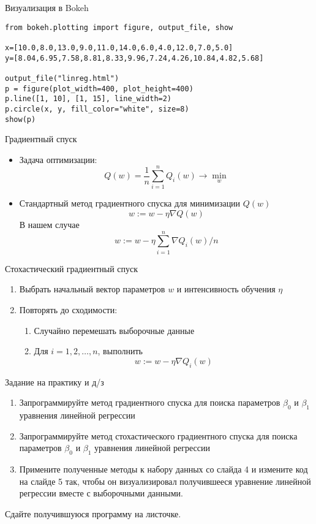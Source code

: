 \documentclass[landscape]{slides}
\begin{document}
\begin{slide}
Визуализация в Bokeh
\begin{verbatim}
from bokeh.plotting import figure, output_file, show

x=[10.0,8.0,13.0,9.0,11.0,14.0,6.0,4.0,12.0,7.0,5.0]
y=[8.04,6.95,7.58,8.81,8.33,9.96,7.24,4.26,10.84,4.82,5.68]

output_file("linreg.html")
p = figure(plot_width=400, plot_height=400)
p.line([1, 10], [1, 15], line_width=2)
p.circle(x, y, fill_color="white", size=8)
show(p)
\end{verbatim}
\end{slide}



\begin{slide}
Градиентный спуск
\begin{itemize}
\item Задача оптимизации:
$$ Q(w) = \frac 1n \sum_{i=1}^n Q_i(w) \to \min_w $$
\item Стандартный метод градиентного спуска для минимизации $Q(w)$
$$ w:=w - \eta \nabla Q(w) $$
В нашем случае
$$ w:=w - \eta \sum_{i=1}^n \nabla Q_i(w)/n $$
\end{itemize}
\end{slide}

\begin{slide}
Стохастический градиентный спуск
\begin{enumerate}
\item Выбрать начальный вектор параметров $w$ и интенсивность обучения $\eta$
\item Повторять до сходимости:
\begin{enumerate}
\item Случайно перемешать выборочные данные
\item Для $i=1,2,\ldots,n$, выполнить
$$ w:=w - \eta \nabla Q_i(w) $$
\end{enumerate}
\end{enumerate}
\end{slide}


\begin{slide}
Задание на практику и д/з
\begin{enumerate}
\item Запрограммируйте метод градиентного спуска для поиска параметров
$\beta_0$ и $\beta_1$ уравнения линейной регрессии
\item Запрограммируйте метод стохастического градиентного спуска для поиска параметров
$\beta_0$ и $\beta_1$ уравнения линейной регрессии
\item Примените полученные методы к набору данных со слайда 4 и
измените код на слайде 5 так, чтобы он визуализировал 
получившееся уравнение линейной регрессии вместе с выборочными данными.
\end{enumerate}
Сдайте получившуюся программу на листочке.
\end{slide}
\end{document}
